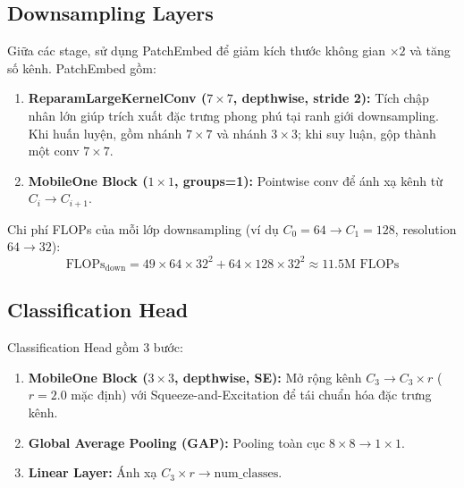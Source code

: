 \subsection{Downsampling Layers}
\label{subsec:downsampling}

Giữa các stage, \fastvit{} sử dụng PatchEmbed để giảm kích thước không gian $\times 2$ và tăng số kênh. PatchEmbed gồm:

\begin{enumerate}
    \item \textbf{ReparamLargeKernelConv ($7 \times 7$, depthwise, stride 2):} Tích chập nhân lớn giúp trích xuất đặc trưng phong phú tại ranh giới downsampling. Khi huấn luyện, gồm nhánh $7 \times 7$ và nhánh $3 \times 3$; khi suy luận, gộp thành một conv $7 \times 7$.
    
    \item \textbf{MobileOne Block ($1 \times 1$, groups=1):} Pointwise conv để ánh xạ kênh từ $C_i \to C_{i+1}$.
\end{enumerate}

Chi phí FLOPs của mỗi lớp downsampling (ví dụ $C_0=64 \to C_1=128$, resolution $64 \to 32$):
\begin{equation}
    \text{FLOPs}_{\text{down}} = 49 \times 64 \times 32^2 + 64 \times 128 \times 32^2 \approx 11.5\text{M FLOPs}
\end{equation}

\subsection{Classification Head}
\label{subsec:cls_head}

Classification Head gồm 3 bước:
\begin{enumerate}
    \item \textbf{MobileOne Block ($3 \times 3$, depthwise, SE):} Mở rộng kênh $C_3 \to C_3 \times r$ ($r = 2.0$ mặc định) với Squeeze-and-Excitation \cite{se2018} để tái chuẩn hóa đặc trưng kênh.
    \item \textbf{Global Average Pooling (GAP):} Pooling toàn cục $8 \times 8 \to 1 \times 1$.
    \item \textbf{Linear Layer:} Ánh xạ $C_3 \times r \to \text{num\_classes}$.
\end{enumerate}

